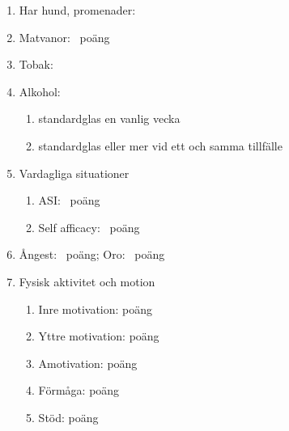 \documentclass[a4paper,twocolumn,swedish,11pt]{article}
\begin{document}
\begin{enumerate}
	\item Har hund, promenader:

	\item Matvanor: {\footnotesize {}~poäng}

	\item Tobak:

	\item Alkohol:

		{\footnotesize\begin{enumerate}
			\item {} standardglas en vanlig vecka
			\item {} standardglas eller mer vid ett och samma tillfälle
		\end{enumerate}}

	\item Vardagliga situationer

		{\footnotesize\begin{enumerate}
			\item ASI: ~poäng

			\item Self afficacy: ~poäng
		\end{enumerate}}

	\item Ångest: {\footnotesize {}~poäng}; Oro: {\footnotesize {}~poäng}

	\item Fysisk aktivitet och motion

		{\footnotesize\begin{enumerate}
			\item Inre motivation: poäng

			\item Yttre motivation: poäng

			\item Amotivation: poäng

			\item Förmåga: poäng

			\item Stöd: poäng
		\end{enumerate}}
\end{enumerate}
\end{document}
